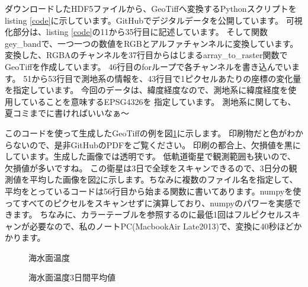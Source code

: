 
ダウンロードしたHDF5ファイルから、GeoTiffへ変換するPythonスクリプトをlisting \ref{code}に示しています。GitHubでデジタルデータを公開しています。
可視化部分は、listing \ref{code}の11から35行目に記述しています。
そして関数gey\_bandで、一つ一つの数値をRGBとアルファチャンネルに変換しています。
変換した、RGBAのチャンネルを37行目からはじまるarray\_to\_raster関数でGeoTiffを作成しています。
46行目のforループで各チャンネルを書き込んでいます。
51から53行目で測地系の情報を、43行目で1ピクセルあたりの座標の変化量を指定しています。
今回のデータは、緯度経度なので、測地系に緯度経度を使用していることを意味するEPSG4326を
指定しています。
測地系に関しても、夏コミまでに書ければいいなぁ〜

このコードを使って生成したGeoTiffの例を図\ref{fig:sst}に示します。
印刷物だと色がわからないので、是非GitHubのPDFをご覧ください。
印刷の都合上、欠損値を黒にしています。生成した画像では透明です。
低軌道衛星で観測範囲も狭いので、欠損値が多いですね。
この衛星は3日で全球をスキャンできるので、3日分の観測値を平均した画像を図\ref{fig:sst-ave}に示します。ちなみに複数のファイル名を指定して、平均をとっているコードは56行目から始まる関数に書いてあります。numpyを使ってすべてのピクセルをスキャンせずに演算しており、numpyのパワーを実感できます。
ちなみに、カラーテーブルを参照するのに最低1回はフルピクセルスキャンが必要なので、私のノートPC(MacbookAir Late2013)で、変換に40秒ほどかかります。


\begin{figure}[t]
\centering
{}
\caption{海水面温度}
\label{fig:sst}
\end{figure}

\begin{figure}[t]
\centering
{}
\caption{海水面温度3日間平均値}
\label{fig:sst-ave}
\end{figure}

